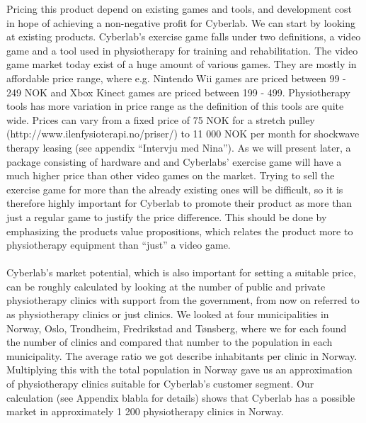 Pricing this product depend on existing games and tools, and development cost in hope of achieving a non-negative profit for Cyberlab. We can start by looking at existing products. Cyberlab's exercise game falls under two definitions, a video game and a tool used in physiotherapy for training and rehabilitation. The video game market today exist of a huge amount of various games. They are mostly in affordable price range, where e.g. Nintendo Wii games are priced between 99 - 249 NOK and Xbox Kinect games are priced between 199 - 499. Physiotherapy tools has more variation in price range as the definition of this tools are quite wide. Prices can vary from a fixed price of 75 NOK for a stretch pulley (http://www.ilenfysioterapi.no/priser/)  to 11 000 NOK per month for shockwave therapy leasing (see appendix “Intervju med Nina”). As we will present later, a package consisting of hardware and and Cyberlabs’ exercise game will have a much higher price than other video games on the market. Trying to sell the exercise game for more than the already existing ones will be difficult, so it is therefore highly important for Cyberlab to promote their product as more than just a regular game to justify the price difference. This should be done by emphasizing the products value propositions, which relates the product more to physiotherapy equipment than “just” a video game. \\ \\
Cyberlab’s market potential, which is also important for setting a suitable price, can be roughly calculated by looking at the number of public and private physiotherapy clinics with support from the government, from now on referred to as physiotherapy clinics or just clinics. We looked at four municipalities in Norway, Oslo, Trondheim, Fredrikstad and T{ø}nsberg, where we for each found the number of clinics and compared that number to the population in each municipality. The average ratio we got describe inhabitants per clinic in Norway. Multiplying this with the total population in Norway gave us an approximation of physiotherapy clinics suitable for Cyberlab's customer segment. Our calculation (see Appendix blabla for details) shows that Cyberlab has a possible market in approximately 1 200 physiotherapy clinics in Norway.\\ \\
